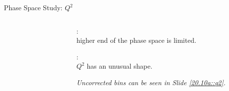 \begin{frame}{Phase Space Study: $Q^2$}
    \label{12.12::q2}

    \begin{columns}[onlytextwidth,T]

    \begin{column}{.80\linewidth}
        \vspace{-15pt}
        \begin{center}
            \begin{figure}[t]
            \end{figure}
        \end{center}
    \end{column}

    \begin{column}{.18\linewidth}
        \small{: \\ higher end of the phase space is limited.}

        \vspace{12pt}

        \small{: \\ $Q^2$ has an unusual shape.}

        \vspace{12pt}

        \small{}

        \vspace{27pt}

        \begin{flushright}
            \tiny{\textit{
                Uncorrected bins can be seen in Slide \textcolor{efd_purple}{\ref{20.10a::q2}}.
            }}
        \end{flushright}
    \end{column}

    \end{columns}
\end{frame}

